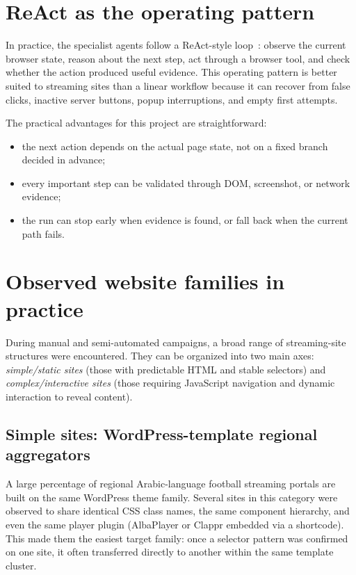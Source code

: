 \section{ReAct as the operating pattern}

In practice, the specialist agents follow a ReAct-style loop~\cite{react}: observe the
current browser state, reason about the next step, act through a browser tool, and check
whether the action produced useful evidence. This operating pattern is better suited to
streaming sites than a linear workflow because it can recover from false clicks, inactive
server buttons, popup interruptions, and empty first attempts.

The practical advantages for this project are straightforward:
\begin{itemize}
  \item the next action depends on the actual page state, not on a fixed branch decided in advance;
  \item every important step can be validated through DOM, screenshot, or network evidence;
  \item the run can stop early when evidence is found, or fall back when the current path fails.
\end{itemize}

\section{Observed website families in practice}

During manual and semi-automated campaigns, a broad range of streaming-site structures
were encountered. They can be organized into two main axes: \emph{simple/static sites}
(those with predictable HTML and stable selectors) and \emph{complex/interactive sites}
(those requiring JavaScript navigation and dynamic interaction to reveal content).

\subsection{Simple sites: WordPress-template regional aggregators}

A large percentage of regional Arabic-language football streaming portals are built
on the same WordPress theme family. Several sites in this category were observed to
share identical CSS class names, the same component hierarchy, and even the same
player plugin (AlbaPlayer or Clappr embedded via a shortcode). This made them the
easiest target family: once a selector pattern was confirmed on one site, it often
transferred directly to another within the same template cluster.

